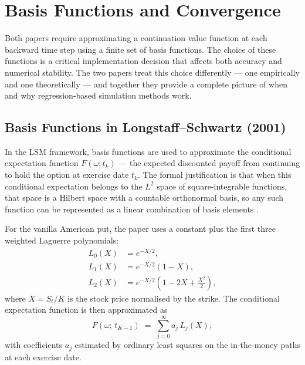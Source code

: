 
\section{Basis Functions and Convergence}

Both papers require approximating a continuation value function at each
backward time step using a finite set of basis functions. The choice of
these functions is a critical implementation decision that affects both
accuracy and numerical stability. The two papers treat this choice
differently --- one empirically and one theoretically --- and together
they provide a complete picture of when and why regression-based simulation
methods work.

\subsection{Basis Functions in Longstaff--Schwartz (2001)}

In the LSM framework, basis functions are used to approximate the
conditional expectation function $F(\omega; t_k)$ --- the expected
discounted payoff from continuing to hold the option at exercise date
$t_k$. The formal justification is that when this conditional expectation
belongs to the $L^2$ space of square-integrable functions, that space is a
Hilbert space with a countable orthonormal basis, so any such function can
be represented as a linear combination of basis elements \citep{longstaff2001}.

For the vanilla American put, the paper uses a constant plus the first
three weighted Laguerre polynomials:
\begin{align}
    L_0(X) &= e^{-X/2}, \label{eq:L0}\\
    L_1(X) &= e^{-X/2}(1 - X), \label{eq:L1}\\
    L_2(X) &= e^{-X/2}\!\left(1 - 2X + \tfrac{X^2}{2}\right), \label{eq:L2}
\end{align}
where $X = S_t / K$ is the stock price normalised by the strike. The
conditional expectation function is then approximated as
\begin{equation}
    F(\omega;\, t_{K-1}) \;=\; \sum_{j=0}^{\infty} a_j\, L_j(X),
    \label{eq:LSM_expansion}
\end{equation}
with coefficients $a_j$ estimated by ordinary least squares on the
in-the-money paths at each exercise date.

